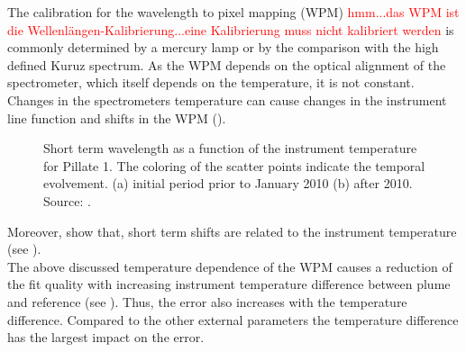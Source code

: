 The calibration for the wavelength to pixel mapping (WPM) \textcolor{red}{hmm...das WPM ist die Wellenlängen-Kalibrierung...eine Kalibrierung muss nicht kalibriert werden} is commonly determined by a mercury lamp or by the comparison with the high defined Kuruz spectrum.
As the WPM depends on the optical alignment of the spectrometer, which itself depends on the temperature, it is not constant.
Changes in the spectrometers temperature can cause changes in the instrument line function and shifts in the WPM (\citep{pinardi2007influence}). 
\begin{figure}		
	\caption{Short term wavelength as a function of the instrument temperature for Pillate 1. The coloring of the scatter points indicate the temporal evolvement. (a) initial period prior to January 2010 (b) after 2010. Source: \cite{WarnachSimon}.}
	\label{fig:shorttermshift}
\end{figure}
Moreover, \cite{WarnachSimon} show that, short term shifts are related to the instrument temperature (see ).\\
The above discussed temperature dependence of the WPM causes a reduction of the fit quality with increasing instrument temperature difference between plume and reference (see ). Thus, the  error also increases with the temperature difference.
Compared to the other external parameters the temperature difference has the largest impact on the  error.\\

